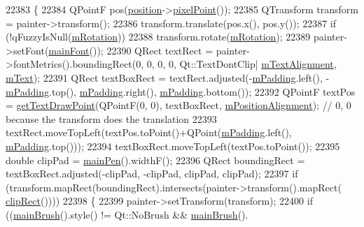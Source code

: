 \begin{DoxyCode}
22383 \{
22384   QPointF pos(\hyperlink{class_q_c_p_item_text_a0d228a00e819022b5690c65762721129}{position}->\hyperlink{class_q_c_p_item_position_ae490f9c76ee2ba33752c495d3b6e8fb5}{pixelPoint}());
22385   QTransform transform = painter->transform();
22386   transform.translate(pos.x(), pos.y());
22387   \textcolor{keywordflow}{if} (!qFuzzyIsNull(\hyperlink{class_q_c_p_item_text_ac37df0061552225d2277e1ee3b48f2cb}{mRotation}))
22388     transform.rotate(\hyperlink{class_q_c_p_item_text_ac37df0061552225d2277e1ee3b48f2cb}{mRotation});
22389   painter->setFont(\hyperlink{class_q_c_p_item_text_a23d391bd6471c45e73f45add67ede902}{mainFont}());
22390   QRect textRect = painter->fontMetrics().boundingRect(0, 0, 0, 0, Qt::TextDontClip|
      \hyperlink{class_q_c_p_item_text_acdb2e50c38e83da00f083771efbd213f}{mTextAlignment}, \hyperlink{class_q_c_p_item_text_a2dec3e08c11f51639629374ecec3bd62}{mText});
22391   QRect textBoxRect = textRect.adjusted(-\hyperlink{class_q_c_p_item_text_ae7b3ef0ce6046efd4b346d28f2e1fb67}{mPadding}.left(), -\hyperlink{class_q_c_p_item_text_ae7b3ef0ce6046efd4b346d28f2e1fb67}{mPadding}.top(), 
      \hyperlink{class_q_c_p_item_text_ae7b3ef0ce6046efd4b346d28f2e1fb67}{mPadding}.right(), \hyperlink{class_q_c_p_item_text_ae7b3ef0ce6046efd4b346d28f2e1fb67}{mPadding}.bottom());
22392   QPointF textPos = \hyperlink{class_q_c_p_item_text_aa6e478b1ce198eace89157c4cacc3ddc}{getTextDrawPoint}(QPointF(0, 0), textBoxRect, 
      \hyperlink{class_q_c_p_item_text_a6c27f7dc1a962a04b32430cf99f04654}{mPositionAlignment}); \textcolor{comment}{// 0, 0 because the transform does the translation}
22393   textRect.moveTopLeft(textPos.toPoint()+QPoint(\hyperlink{class_q_c_p_item_text_ae7b3ef0ce6046efd4b346d28f2e1fb67}{mPadding}.left(), 
      \hyperlink{class_q_c_p_item_text_ae7b3ef0ce6046efd4b346d28f2e1fb67}{mPadding}.top()));
22394   textBoxRect.moveTopLeft(textPos.toPoint());
22395   \textcolor{keywordtype}{double} clipPad = \hyperlink{class_q_c_p_item_text_a9ade32d362b22853659201c738269e2a}{mainPen}().widthF();
22396   QRect boundingRect = textBoxRect.adjusted(-clipPad, -clipPad, clipPad, clipPad);
22397   \textcolor{keywordflow}{if} (transform.mapRect(boundingRect).intersects(painter->transform().mapRect(
      \hyperlink{class_q_c_p_abstract_item_a538e25ff8856534582f5b2b400a46405}{clipRect}())))
22398   \{
22399     painter->setTransform(transform);
22400     \textcolor{keywordflow}{if} ((\hyperlink{class_q_c_p_item_text_a10d6585a030633aa79d5ebc5a437f183}{mainBrush}().style() != Qt::NoBrush && \hyperlink{class_q_c_p_item_text_a10d6585a030633aa79d5ebc5a437f183}{mainBrush}().

\end{DoxyCode}
